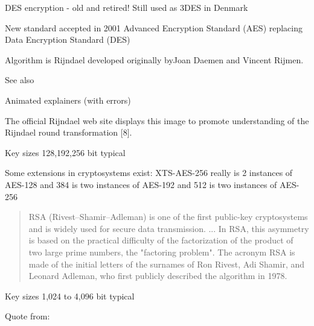 \documentclass[Screen16to9,17pt]{foils}
\begin{document}
\begin{list1}
\item DES encryption - old and retired! Still used as 3DES in Denmark
\item New standard accepted in 2001 Advanced Encryption
  Standard (AES) replacing Data Encryption Standard (DES)
\item Algorithm is Rijndael developed originally byJoan Daemen and Vincent Rijmen.
\item See also 
\item Animated explainers (with errors) 
\end{list1}



\begin{list2}
\item The official Rijndael web site displays this image to promote understanding of the Rijndael round transformation [8].
\item Key sizes 128,192,256 bit typical
\item Some extensions in cryptosystems exist: XTS-AES-256 really is 2 instances of AES-128 and 384 is two instances of AES-192 and 512 is two instances of AES-256
\item {}
\end{list2}



\begin{quote}
RSA (Rivest–Shamir–Adleman) is one of the first public-key cryptosystems and is widely used for secure data transmission. ...
In RSA, this asymmetry is based on the practical difficulty of the factorization of the product of two large prime numbers, the "factoring problem". The acronym RSA is made of the initial letters of the surnames of Ron Rivest, Adi Shamir, and Leonard Adleman, who first publicly described the algorithm in 1978.
\end{quote}

\begin{list2}
\item Key sizes 1,024 to 4,096 bit typical
\item  Quote from: 
\end{list2}
\end{document}
